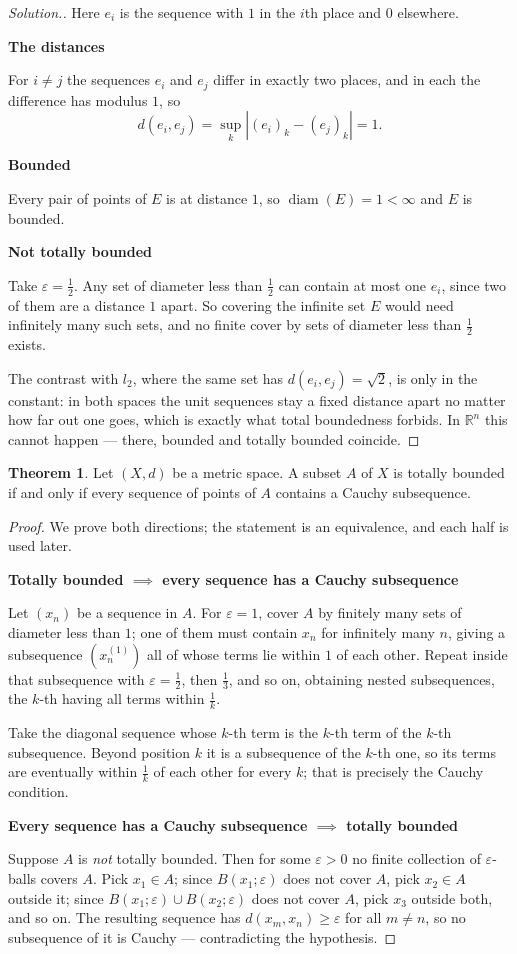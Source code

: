 \documentclass[11pt,a4paper]{article}
\theoremstyle{definition}
\newtheorem{thm}{Theorem}[section]
\DeclareMathOperator{\diam}{diam}
\newenvironment{solution}
  {\renewcommand{\qedsymbol}{}\begin{proof}[\textit{Solution}.]}
  {\end{proof}}
\newcommand{\subhead}[1]{%
  \par\medskip\noindent\textbf{#1}\par\nobreak\smallskip}
\begin{document}
\begin{solution}
Here $e_i$ is the sequence with $1$ in the $i$th place and $0$ elsewhere.

\subhead{The distances}
For $i\neq j$ the sequences $e_i$ and $e_j$ differ in exactly two places, and in each the difference has modulus $1$, so
$$d(e_i,e_j)=\sup_k|(e_i)_k-(e_j)_k|=1 .$$

\subhead{Bounded}
Every pair of points of $E$ is at distance $1$, so $\diam(E)=1<\infty$ and $E$ is bounded.

\subhead{Not totally bounded}
Take $\varepsilon=\frac12$. Any set of diameter less than $\frac12$ can contain at most one $e_i$, since two of them are a distance $1$ apart. So covering the infinite set $E$ would need infinitely many such sets, and no finite cover by sets of diameter less than $\frac12$ exists.

The contrast with $l_2$, where the same set has $d(e_i,e_j)=\sqrt2$, is only in the constant: in both spaces the unit sequences stay a fixed distance apart no matter how far out one goes, which is exactly what total boundedness forbids. In $\mathbb{R}^n$ this cannot happen --- there, bounded and totally bounded coincide.
\end{solution}


\begin{thm}
Let $(X,d)$ be a metric space. A subset $A$ of $X$ is totally bounded if and only if every sequence of points of $A$ contains a Cauchy subsequence.

\end{thm}

\begin{proof}
We prove both directions; the statement is an equivalence, and each half is
used later.

\subhead{Totally bounded $\implies$ every sequence has a Cauchy subsequence}
Let $(x_n)$ be a sequence in $A$. For $\varepsilon=1$, cover $A$ by finitely
many sets of diameter less than $1$; one of them must contain $x_n$ for
infinitely many $n$, giving a subsequence $(x_n^{(1)})$ all of whose terms lie
within $1$ of each other. Repeat inside that subsequence with
$\varepsilon=\frac12$, then $\frac13$, and so on, obtaining nested
subsequences, the $k$-th having all terms within $\frac1k$.

Take the diagonal sequence whose $k$-th term is the $k$-th term of the $k$-th
subsequence. Beyond position $k$ it is a subsequence of the $k$-th one, so its
terms are eventually within $\frac1k$ of each other for every $k$; that is
precisely the Cauchy condition.

\subhead{Every sequence has a Cauchy subsequence $\implies$ totally bounded}
Suppose $A$ is \emph{not} totally bounded. Then for some $\varepsilon>0$ no
finite collection of $\varepsilon$-balls covers $A$. Pick $x_1\in A$; since
$B(x_1;\varepsilon)$ does not cover $A$, pick $x_2\in A$ outside it; since
$B(x_1;\varepsilon)\cup B(x_2;\varepsilon)$ does not cover $A$, pick $x_3$
outside both, and so on. The resulting sequence has $d(x_m,x_n)\geq\varepsilon$
for all $m\neq n$, so no subsequence of it is Cauchy --- contradicting the
hypothesis.
\end{proof}
\end{document}
